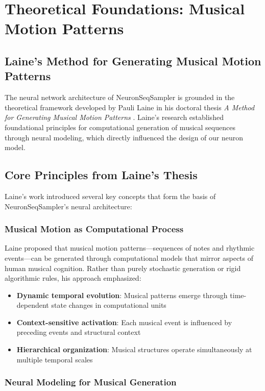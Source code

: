\documentclass[11pt,a4paper]{article}
\begin{document}
\section{Theoretical Foundations: Musical Motion Patterns}

\subsection{Laine's Method for Generating Musical Motion Patterns}

The neural network architecture of NeuronSeqSampler is grounded in the theoretical framework developed by Pauli Laine in his doctoral thesis \textit{A Method for Generating Musical Motion Patterns} \cite{laine2000}. Laine's research established foundational principles for computational generation of musical sequences through neural modeling, which directly influenced the design of our neuron model.

\subsection{Core Principles from Laine's Thesis}

Laine's work introduced several key concepts that form the basis of NeuronSeqSampler's neural architecture:

\subsubsection{Musical Motion as Computational Process}

Laine proposed that musical motion patterns—sequences of notes and rhythmic events—can be generated through computational models that mirror aspects of human musical cognition. Rather than purely stochastic generation or rigid algorithmic rules, his approach emphasized:

\begin{itemize}
\item \textbf{Dynamic temporal evolution}: Musical patterns emerge through time-dependent state changes in computational units
\item \textbf{Context-sensitive activation}: Each musical event is influenced by preceding events and structural context
\item \textbf{Hierarchical organization}: Musical structures operate simultaneously at multiple temporal scales
\end{itemize}

\subsubsection{Neural Modeling for Musical Generation}
\end{document}
